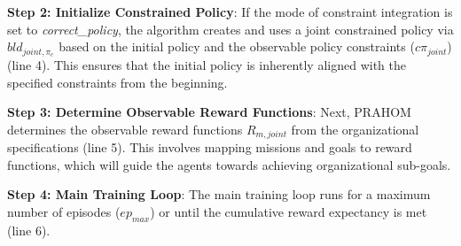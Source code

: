 \documentclass[conference]{IEEEtran}
\begin{document}
\textbf{Step 2: Initialize Constrained Policy}: \quad
If the mode of constraint integration is set to \textit{correct\_policy}, the algorithm creates and uses a joint constrained policy via $bld_{joint, \pi_c}$ based on the initial policy and the observable policy constraints ($c\pi_{joint}$) (line 4). This ensures that the initial policy is inherently aligned with the specified constraints from the beginning.

\textbf{Step 3: Determine Observable Reward Functions}: \quad
Next, PRAHOM determines the observable reward functions $R_{m,joint}$ from the organizational specifications (line 5). This involves mapping missions and goals to reward functions, which will guide the agents towards achieving organizational sub-goals.

\textbf{Step 4: Main Training Loop}: \quad
The main training loop runs for a maximum number of episodes ($ep_{max}$) or until the cumulative reward expectancy is met (line 6).
\end{document}
